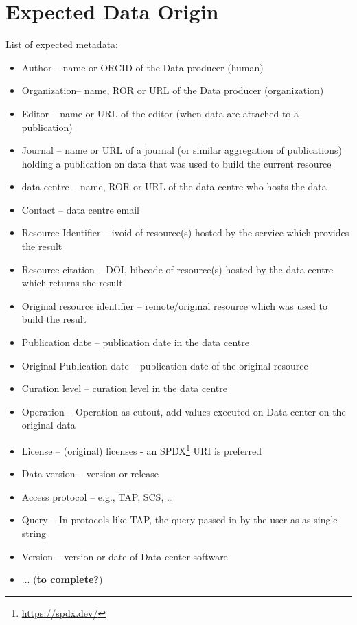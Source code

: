 \documentclass[11pt,a4paper]{ivoa}
\begin{document}
\section{Expected Data Origin}

List of expected metadata:

\begin{itemize}
\item Author -- name or ORCID of the Data producer (human)
\item Organization--  name, ROR or URL of the Data producer (organization)
\item Editor -- name or URL  of the editor (when data are attached to a publication)
\item Journal -- name or URL of a journal (or similar aggregation of publications) holding a publication on data that was used to build the current resource
\item data centre -- name, ROR or URL of the data centre who hosts the data
\item Contact -- data centre email
\item Resource Identifier -- ivoid of resource(s) hosted by the service which provides the result
\item Resource citation -- DOI, bibcode of resource(s) hosted by the data centre which returns the result
\item Original resource identifier -- remote/original resource which was used to build the result
\item Publication date -- publication date in the data centre
\item Original Publication date --  publication date of the original resource
\item Curation level -- curation level in the data centre
\item Operation -- Operation as cutout, add-values executed on Data-center on the original data
\item License -- (original) licenses - an SPDX\footnote{\url{https://spdx.dev/}}
URI is preferred
\item Data version -- version or release
\item Access protocol --  e.g., TAP, SCS, \dots
\item Query -- In protocols like TAP, the query passed in by the user as
as single string
\item Version -- version or date of Data-center software
\item ... (\textbf{to complete?})
\end{itemize}
\end{document}
